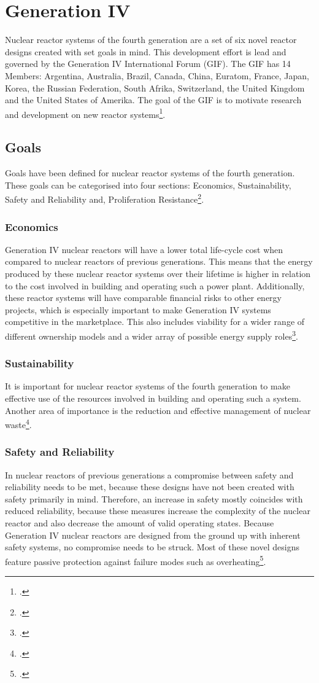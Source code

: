 \chapter{Generation IV}
Nuclear reactor systems of the fourth generation are a set of six novel reactor designs created with
set goals in mind. This development effort is lead and governed by the Generation IV International Forum
(GIF). The GIF has 14 Members: Argentina, Australia, Brazil, Canada, China, Euratom, France, Japan,
Korea, the Russian Federation, South Afrika, Switzerland, the United Kingdom and the United States of Amerika.
The goal of the GIF is to motivate research and development on new reactor systems\footcite[6]{GIFAR}.
\section{Goals}
Goals have been defined for nuclear reactor systems of the fourth generation. These goals
can be categorised into four sections: Economics, Sustainability, Safety and Reliability and, Proliferation Resistance\footcite[38]{IVHandbook}.
\subsection{Economics}
Generation IV nuclear reactors will have a lower total life-cycle cost when compared to nuclear reactors
of previous generations. This means that the energy produced by these nuclear reactor systems over
their lifetime is higher in relation to the cost involved in building and operating such a power plant.
Additionally, these reactor systems will have comparable financial risks to other energy projects, which
is especially important to make Generation IV systems competitive in the marketplace. This also includes
viability for a wider range of different ownership models and a wider array of possible energy supply roles\footcite[6]{GIFAR}.
\subsection{Sustainability}
It is important for nuclear reactor systems of the fourth generation to make effective use of the resources
involved in building and operating such a system. Another area of importance is the reduction and effective
management of nuclear waste\footcite[38]{IVHandbook}.
\subsection{Safety and Reliability}
In nuclear reactors of previous generations a compromise between safety and reliability needs to be met,
because these designs have not been created with safety primarily in mind. Therefore, an increase in safety
mostly coincides with reduced reliability, because these measures increase the complexity of the nuclear reactor and
also decrease the amount of valid operating states. Because Generation IV nuclear reactors are designed from the ground up
with inherent safety systems, no compromise needs to be struck. Most of these novel designs feature passive
protection against failure modes such as overheating\footcite[6]{GIFAR}.
